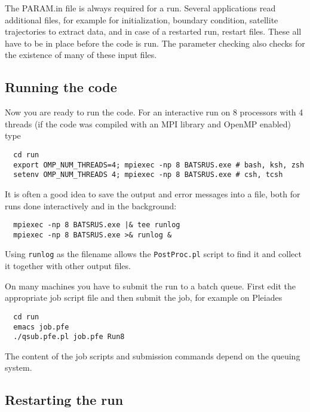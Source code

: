 The PARAM.in file is always required for a run. Several applications read additional files,
for example for initialization, boundary condition, satellite trajectories to extract data, 
and in case of a restarted run, restart files. These all have to be in place before
the code is run. The parameter checking also checks for the existence of many of these
input files.

\subsection{Running the code}

Now you are ready to run the code. For an interactive run 
on 8 processors with 4 threads (if the code was compiled with an MPI
library and OpenMP enabled) type
\begin{verbatim}
  cd run
  export OMP_NUM_THREADS=4; mpiexec -np 8 BATSRUS.exe # bash, ksh, zsh
  setenv OMP_NUM_THREADS 4; mpiexec -np 8 BATSRUS.exe # csh, tcsh
\end{verbatim}
It is often a good idea to save the output and error messages into a file,
both for runs done interactively and in the background:
\begin{verbatim}
  mpiexec -np 8 BATSRUS.exe |& tee runlog
  mpiexec -np 8 BATSRUS.exe >& runlog &
\end{verbatim}
Using {\tt runlog} as the filename allows the {\tt PostProc.pl} script
to find it and collect it together with other output files.

On many machines you have to submit the run to a batch queue.
First edit the appropriate job script file and then submit the job,
for example on Pleiades
\begin{verbatim}
  cd run
  emacs job.pfe
  ./qsub.pfe.pl job.pfe Run8
\end{verbatim}
The content of the job scripts and submission commands depend on
the queuing system. 

\subsection{Restarting the run}

